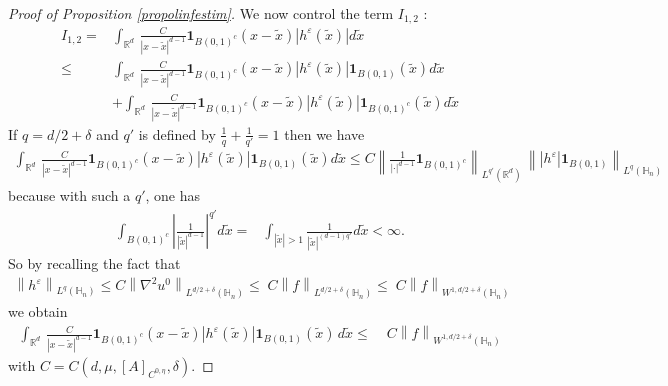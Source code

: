 \documentclass[11pt, reqno]{amsart}
\theoremstyle{definition}
\theoremstyle{remark}
\numberwithin{equation}{section}
\begin{document}
\begin{proof}[Proof of Proposition \textup{\ref{propolinfestim}}]
		We now control the term $I_{1,2}$ :
		\begin{align}
			I_{1,2}=& \int_{\mathbb{R}^d} \,  \frac{C}{|x- \tilde{x}|^{d-1}}   \mathbf{1}_{B(0,1)^c} (x- \tilde{x})|h^\varepsilon(\tilde{x}) |  d\tilde{x}\nonumber\\
			\leq& \int_{\mathbb{R}^d} \,  \frac{C}{|x- \tilde{x}|^{d-1}}   \mathbf{1}_{B(0,1)^c} (x- \tilde{x})|h^\varepsilon(\tilde{x}) |\mathbf{1}_{B(0,1)} (\tilde{x})  d\tilde{x}\nonumber\\
			&+  \int_{\mathbb{R}^d} \,  \frac{C}{|x- \tilde{x}|^{d-1}}   \mathbf{1}_{B(0,1)^c} (x- \tilde{x})|h^\varepsilon(\tilde{x}) | \mathbf{1}_{B(0,1)^c} (\tilde{x}) d\tilde{x}\label{A+B}
		\end{align}
		If  $q=d/2+\delta$ and $q'$ is defined by $\frac{1}{q}+\frac{1}{q'}=1$ then we have
		\begin{align*}
			\int_{\mathbb{R}^d} \,  \frac{C}{|x- \tilde{x}|^{d-1}}   \mathbf{1}_{B(0,1)^c} (x- \tilde{x})|h^\varepsilon(\tilde{x}) |\mathbf{1}_{B(0,1)} (\tilde{x})  d\tilde{x}\leq C\left\| \frac{1}{|\cdot|^{d-1}}\mathbf{1}_{B(0,1)^c} \right\|_{L^{q'}(\mathbb{R}^d)} \, \left\| |h^\varepsilon |\mathbf{1}_{B(0,1)} \right\|_{L^{q}(\mathbb{H}_n)}
		\end{align*}
		because with such a $q'$, one has
		\begin{align*}
			\int_{{B(0,1)^c}} \left|  \frac{1}{|\tilde{x}|^{d-1}}   \right|^{q'} d\tilde{x}
			=&	\int_{|\tilde{x}|>1} \frac{1}{|\tilde{x}|^{(d-1)q'}} d\tilde{x}<\infty.
		\end{align*}
		So by recalling the fact that
		\begin{align*}
			\left\| h^\varepsilon \right\|_{L^{q}(\mathbb{H}_n)}\leq C \left\| \nabla^2 u^0\right\|_{L^{d/2+\delta}(\mathbb{H}_n)}
			\leq\; C \left\|f\right\|_{L^{d/2+\delta}(\mathbb{H}_n)}
			\leq\; C\left\|f\right\|_{W^{1,d/2+\delta}(\mathbb{H}_n)}
		\end{align*}
		we obtain 
		\begin{align}\label{bound_of_A}
			\int_{\mathbb{R}^d} \,  \frac{C}{|x- \tilde{x}|^{d-1}}   \mathbf{1}_{B(0,1)^c} (x- \tilde{x})|h^\varepsilon(\tilde{x}) |\mathbf{1}_{B(0,1)} (\tilde{x}) \, d\tilde{x}
			\leq&\; C\left\|f\right\|_{W^{1,d/2+\delta}(\mathbb{H}_n)}
		\end{align}
		with $C=	 C(d,\mu,[A]_{C^{0,\eta}},\delta)$.
		

\end{proof}
\end{document}

